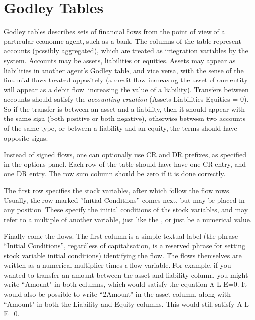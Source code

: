 \section{Godley Tables}\label{godley}\label{GodleyIcon}

Godley tables describes sets of financial flows from the point of view
of a particular economic agent, such as a bank. The columns of the
table represent accounts (possibly aggregated), which are treated as
integration variables by the system. Accounts may be assets,
liabilities or equities. Assets may appear as liabilities in another
agent's Godley table, and vice versa, with the sense of the financial
flows treated oppositely (a credit flow increasing the asset of one
entity will appear as a debit flow, increasing the value of a
liability). Transfers between accounts should satisfy the {\em
  accounting equation}
(Assets-Liabilities-Equities = 0). So if the transfer is between an
asset and a liability, then it should appear with the same sign (both
positive or both negative), otherwise between two accounts of the same
type, or between a liability and an equity, the terms should have
opposite signs.

Instead of signed flows, one can optionally use CR and DR prefixes, as
specified in the options panel. Each row of the table should have have
one CR entry, and one DR entry. The row sum column should be zero if
it is done correctly.

The first row specifies the stock variables, after which follow the
flow rows. Usually, the row marked ``Initial Conditions'' comes next,
but may be placed in any position. These specify the initial
conditions of the stock variables, and may refer to a multiple of
another variable, just like the , or just be a numerical value.

Finally come the flows. The first column is a simple textual label
(the phrase ``Initial Conditions'', regardless of capitalisation, is a
reserved phrase for setting stock variable initial conditions)
identifying the flow. The flows themselves are written as a numerical
multiplier times a flow variable. For example, if you wanted to transfer
an amount between the asset and liability column, you might write
``Amount" in both columns, which would satisfy the equation A-L-E=0.
It would also be possible to write ``2Amount" in the asset column, 
along with ``Amount" in both the Liability and Equity columns. This would
still satisfy A-L-E=0.


